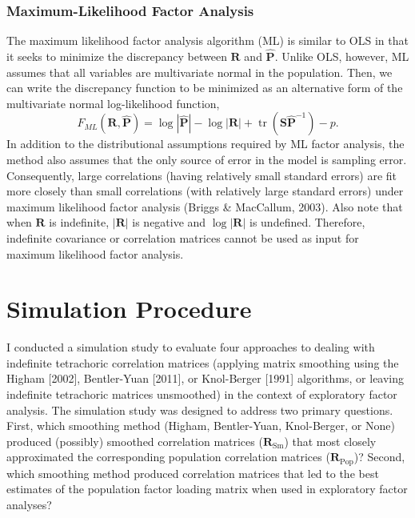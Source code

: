 \documentclass[
  english,
  man]{apa6}
\begin{document}
\hypertarget{maximum-likelihood-factor-analysis}{%
\subsubsection{Maximum-Likelihood Factor Analysis}\label{maximum-likelihood-factor-analysis}}

The maximum likelihood factor analysis algorithm (ML) is similar to OLS in that it seeks to minimize the discrepancy between \(\mathbf{R}\) and \(\hat{\mathbf{P}}\). Unlike OLS, however, ML assumes that all variables are multivariate normal in the population. Then, we can write the discrepancy function to be minimized as an alternative form of the multivariate normal log-likelihood function,
\begin{equation}
F_{ML}(\mathbf{R}, \hat{\mathbf{P}}) = \log|\hat{\mathbf{P}}| - \log|\mathbf{R}| + \mathop{\mathrm{tr}}(\mathbf{S}\hat{\mathbf{P}}^{-1}) - p.
\label{eq:ml-discrepancy}
\end{equation}
In addition to the distributional assumptions required by ML factor analysis, the method also assumes that the only source of error in the model is sampling error. Consequently, large correlations (having relatively small standard errors) are fit more closely than small correlations (with relatively large standard errors) under maximum likelihood factor analysis (Briggs \& MacCallum, 2003). Also note that when \(\mathbf{R}\) is indefinite, \(|\mathbf{R}|\) is negative and \(\log |\mathbf{R}|\) is undefined. Therefore, indefinite covariance or correlation matrices cannot be used as input for maximum likelihood factor analysis.

\hypertarget{simulation-procedure}{%
\section{Simulation Procedure}\label{simulation-procedure}}

I conducted a simulation study to evaluate four approaches to dealing with indefinite tetrachoric correlation matrices (applying matrix smoothing using the Higham {[}2002{]}, Bentler-Yuan {[}2011{]}, or Knol-Berger {[}1991{]} algorithms, or leaving indefinite tetrachoric matrices unsmoothed) in the context of exploratory factor analysis. The simulation study was designed to address two primary questions. First, which smoothing method (Higham, Bentler-Yuan, Knol-Berger, or None) produced (possibly) smoothed correlation matrices (\(\mathbf{R}_{\textrm{Sm}}\)) that most closely approximated the corresponding population correlation matrices (\(\mathbf{R}_{\textrm{Pop}}\))? Second, which smoothing method produced correlation matrices that led to the best estimates of the population factor loading matrix when used in exploratory factor analyses?
\end{document}
